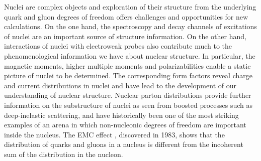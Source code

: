 Nuclei are complex objects and exploration of their structure from the underlying quark and gluon degrees of freedom offers challenges and opportunities for new calculations. On the one hand, the spectroscopy and decay channels of excitations of nuclei are an important source of structure information. On the other hand, interactions of nuclei with electroweak probes also contribute much to the phenomenological information we have about nuclear structure. 
In particular, the magnetic moments,  higher multiple moments and polarizabilities  enable a static picture of nuclei to be determined. The corresponding form factors reveal charge and current distributions in nuclei and  have lead to the 
development of our understanding of nuclear structure. 
Nuclear parton distributions provide further information on the substructure of nuclei as seen from boosted processes such as deep-inelastic scattering, and have historically been one of the 
most striking examples of an arena in which non-nucleonic degrees of freedom are important inside the nucleus. The EMC effect \cite{Aubert:1983XX}, discovered in 1983, shows that the distribution of quarks and gluons in a nucleus is different from the incoherent sum of the distribution in the nucleon.

